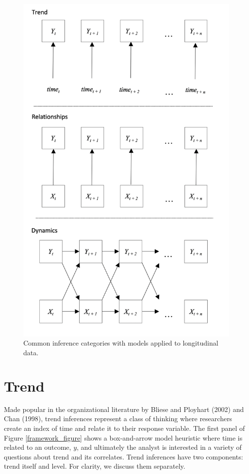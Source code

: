 \documentclass[english,,man]{apa6}
\theoremstyle{definition}
\theoremstyle{definition}
\theoremstyle{definition}
\theoremstyle{remark}
\begin{document}
\begin{figure}

{\centering \includegraphics[width=4.66in]{figures/dynamics/framework} 

}

\caption{Common inference categories with models applied to longitudinal data.\label{framework_figure}}\label{fig:unnamed-chunk-6}
\end{figure}

\hypertarget{trend}{%
\section{Trend}\label{trend}}

Made popular in the organizational literature by Bliese and Ployhart
(2002) and Chan (1998), trend inferences represent a class of thinking
where researchers create an index of time and relate it to their
response variable. The first panel of Figure \ref{framework_figure}
shows a box-and-arrow model heuristic where time is related to an
outcome, \(y\), and ultimately the analyst is interested in a variety of
questions about trend and its correlates. Trend inferences have two
components: trend itself and level. For clarity, we discuss them
separately.
\end{document}
